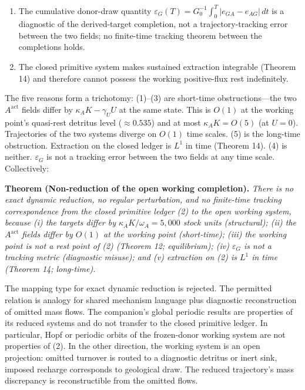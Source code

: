 \documentclass[11pt]{article}
\begin{document}
\begin{enumerate}
  figures \(E^* \approx 2.090\), \(N^* = 89.526\),
  \(A^{\mathrm{act,*}} = 397.87\), and the recharge \(4.652\) are
  imported at the companion's registered precision; the reverse check
  \(qE^*N^* = 0.001 \times 2.090 \times 89.526 \approx 0.187\) is
  consistent to the quoted digits.
\item
  The cumulative donor-draw quantity
  \(\varepsilon_G(T) = G_0^{-1}\int_0^T |e_{GA} - e_{AG}|\, dt\) is a
  diagnostic of the derived-target completion, not a trajectory-tracking
  error between the two fields; no finite-time tracking theorem between
  the completions holds.
\item
  The closed primitive system makes sustained extraction integrable
  (Theorem 14) and therefore cannot possess the working positive-flux
  rest indefinitely.
\end{enumerate}

The five reasons form a trichotomy: (1)--(3) are short-time obstructions---the two \(A^{\mathrm{act}}\) fields differ by \(\kappa_A K - \gamma_U U\) at the same state. This is \(O(1)\) at the working point's quasi-rest detritus level (\(\approx 0.535\)) and at most \(\kappa_A K = O(5)\) (at \(U = 0\)). Trajectories of the two systems diverge on \(O(1)\) time scales. (5) is the long-time obstruction. Extraction on the closed ledger is \(L^1\) in time (Theorem 14). (4) is neither. \(\varepsilon_G\) is not a tracking error between the two fields at any time scale. Collectively:

\textbf{Theorem (Non-reduction of the open working completion).}
\emph{There is no exact dynamic reduction, no regular perturbation, and
no finite-time tracking correspondence from the closed primitive ledger
(2) to the open working system, because (i) the targets differ by
\(\kappa_A K/\omega_A = 5{,}000\) stock units (structural); (ii) the
\(A^{\mathrm{act}}\) fields differ by \(O(1)\) at the working point
(short-time); (iii) the working point is not a rest point of (2)
(Theorem 12; equilibrium); (iv) \(\varepsilon_G\) is not a tracking
metric (diagnostic misuse); and (v) extraction on (2) is \(L^1\) in time
(Theorem 14; long-time).}

The mapping type for exact dynamic reduction is rejected. The permitted relation is analogy for shared mechanism language plus diagnostic reconstruction of omitted mass flows. The companion's global periodic results are properties of its reduced systems and do not transfer to the closed primitive ledger. In particular, Hopf or periodic orbits of the frozen-donor working system are not properties of (2). In the other direction, the working system is an open projection: omitted turnover is routed to a diagnostic detritus or inert sink, imposed recharge corresponds to geological draw. The reduced trajectory's mass discrepancy is reconstructible from the omitted flows.
\end{document}
